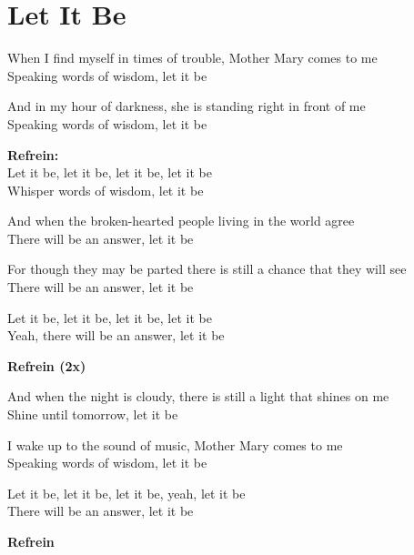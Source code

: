 \section{Let It Be}
When I find myself in times of trouble, Mother Mary comes to me\\
Speaking words of wisdom, let it be

And in my hour of darkness, she is standing right in front of me\\
Speaking words of wisdom, let it be

\textbf{Refrein:}\\
Let it be, let it be, let it be, let it be\\
Whisper words of wisdom, let it be

And when the broken-hearted people living in the world agree\\
There will be an answer, let it be

For though they may be parted there is still a chance that they will see\\
There will be an answer, let it be

Let it be, let it be, let it be, let it be\\
Yeah, there will be an answer, let it be

\textbf{Refrein (2x)}

And when the night is cloudy, there is still a light that shines on me\\
Shine until tomorrow, let it be

I wake up to the sound of music, Mother Mary comes to me\\
Speaking words of wisdom, let it be

Let it be, let it be, let it be, yeah, let it be\\
There will be an answer, let it be

\textbf{Refrein}
